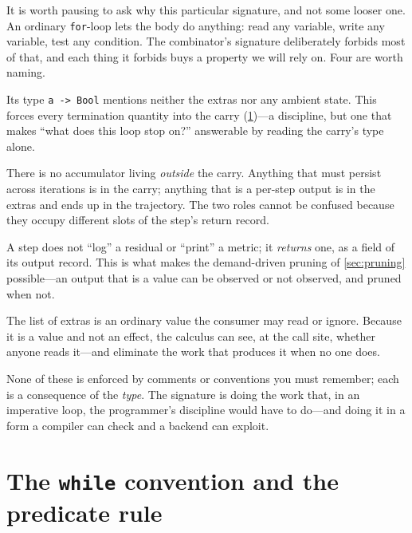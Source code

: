 It is worth pausing to ask why this particular signature, and not some looser
one. An ordinary \texttt{for}-loop lets the body do anything: read any variable,
write any variable, test any condition. The combinator's signature deliberately
forbids most of that, and each thing it forbids buys a property we will rely on.
Four are worth naming.

\begin{description}[style=nextline, leftmargin=0pt, font=\normalfont\itshape]
  \item[The predicate sees the carry only.] Its type
  \lstinline[style=l4style]|a -> Bool| mentions neither the extras nor any
  ambient state. This forces every termination quantity into the carry
  (\cref{sec:predicaterule})---a discipline, but one that makes ``what does this
  loop stop on?'' answerable by reading the carry's type alone.
  \item[The carry is value-threaded; the extras are record-spread.] There is no
  accumulator living \emph{outside} the carry. Anything that must persist across
  iterations is in the carry; anything that is a per-step output is in the extras
  and ends up in the trajectory. The two roles cannot be confused because they
  occupy different slots of the step's return record.
  \item[Per-step output is a declared field, not a side effect.] A step does not
  ``log'' a residual or ``print'' a metric; it \emph{returns} one, as a field of
  its output record. This is what makes the demand-driven pruning of
  \cref{sec:pruning} possible---an output that is a value can be observed or not
  observed, and pruned when not.
  \item[The trajectory is observed structurally.] The list of extras is an
  ordinary value the consumer may read or ignore. Because it is a value and not an
  effect, the calculus can see, at the call site, whether anyone reads it---and
  eliminate the work that produces it when no one does.
\end{description}

None of these is enforced by comments or conventions you must remember; each is a
consequence of the \emph{type}. The signature is doing the work that, in an
imperative loop, the programmer's discipline would have to do---and doing it in a
form a compiler can check and a backend can exploit.

\section{The \texttt{while} convention and the predicate rule}
\label{sec:predicaterule}


